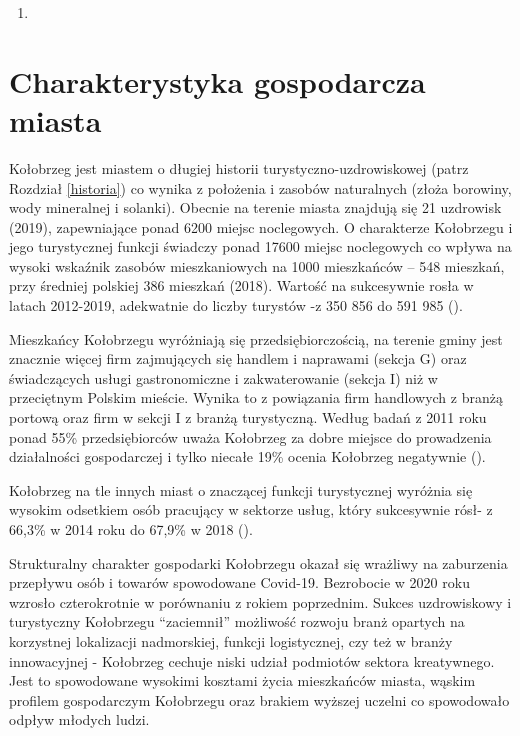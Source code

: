 \documentclass{amuthesis}
\begin{document}
\begin{enumerate}
\def\labelenumi{(\arabic{enumi})}
\tightlist
\item
\end{enumerate}

\hypertarget{gosp}{%
\section{Charakterystyka gospodarcza miasta}\label{gosp}}

Kołobrzeg jest miastem o długiej historii turystyczno-uzdrowiskowej (patrz Rozdział \ref{historia}) co wynika z położenia i zasobów naturalnych (złoża borowiny, wody mineralnej i solanki).
Obecnie na terenie miasta znajdują się 21 uzdrowisk (2019), zapewniające ponad 6200 miejsc noclegowych.
O charakterze Kołobrzegu i jego turystycznej funkcji świadczy ponad 17600 miejsc noclegowych co wpływa na wysoki wskaźnik zasobów mieszkaniowych na 1000 mieszkańców -- 548 mieszkań, przy średniej polskiej 386 mieszkań (2018).
Wartość na sukcesywnie rosła w latach 2012-2019, adekwatnie do liczby turystów -z 350 856 do 591 985 (\textcite{smartcity}).

Mieszkańcy Kołobrzegu wyróżniają się przedsiębiorczością, na terenie gminy jest znacznie więcej firm zajmujących się handlem i naprawami (sekcja G) oraz świadczących usługi gastronomiczne i zakwaterowanie (sekcja I) niż w przeciętnym Polskim mieście.
Wynika to z powiązania firm handlowych z branżą portową oraz firm w sekcji I z branżą turystyczną.
Według badań z 2011 roku ponad 55\% przedsiębiorców uważa Kołobrzeg za dobre miejsce do prowadzenia działalności gospodarczej i tylko niecałe 19\% ocenia Kołobrzeg negatywnie (\textcite{eurotest}).

Kołobrzeg na tle innych miast o znaczącej funkcji turystycznej wyróżnia się wysokim odsetkiem osób pracujący w sektorze usług, który sukcesywnie rósł- z 66,3\% w 2014 roku do 67,9\% w 2018 (\textcite{smartcity}).

Strukturalny charakter gospodarki Kołobrzegu okazał się wrażliwy na zaburzenia przepływu osób i towarów spowodowane Covid-19.
Bezrobocie w 2020 roku wzrosło czterokrotnie w porównaniu z rokiem poprzednim.
Sukces uzdrowiskowy i turystyczny Kołobrzegu ``zaciemnił'' możliwość rozwoju branż opartych na korzystnej lokalizacji nadmorskiej, funkcji logistycznej, czy też w branży innowacyjnej - Kołobrzeg cechuje niski udział podmiotów sektora kreatywnego.
Jest to spowodowane wysokimi kosztami życia mieszkańców miasta, wąskim profilem gospodarczym Kołobrzegu oraz brakiem wyższej uczelni co spowodowało odpływ młodych ludzi.
\end{document}
